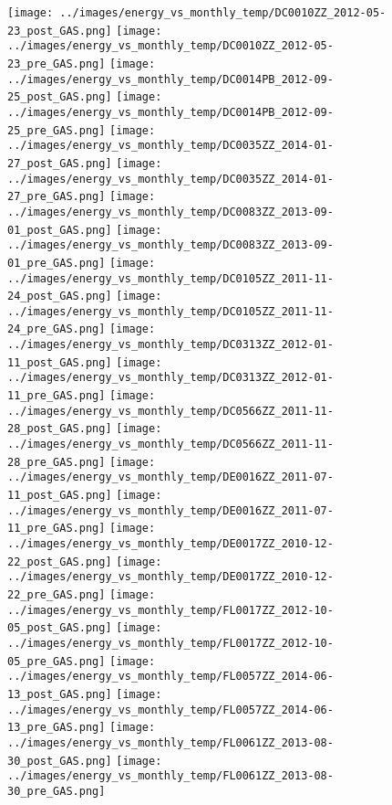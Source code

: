 \clearpage
\begin{figure}
\centering
\texttt{[image: ../images/energy\_vs\_monthly\_temp/DC0010ZZ\_2012-05-23\_post\_GAS.png]}
\texttt{[image: ../images/energy\_vs\_monthly\_temp/DC0010ZZ\_2012-05-23\_pre\_GAS.png]}
\texttt{[image: ../images/energy\_vs\_monthly\_temp/DC0014PB\_2012-09-25\_post\_GAS.png]}
\texttt{[image: ../images/energy\_vs\_monthly\_temp/DC0014PB\_2012-09-25\_pre\_GAS.png]}
\texttt{[image: ../images/energy\_vs\_monthly\_temp/DC0035ZZ\_2014-01-27\_post\_GAS.png]}
\texttt{[image: ../images/energy\_vs\_monthly\_temp/DC0035ZZ\_2014-01-27\_pre\_GAS.png]}
\texttt{[image: ../images/energy\_vs\_monthly\_temp/DC0083ZZ\_2013-09-01\_post\_GAS.png]}
\texttt{[image: ../images/energy\_vs\_monthly\_temp/DC0083ZZ\_2013-09-01\_pre\_GAS.png]}
\texttt{[image: ../images/energy\_vs\_monthly\_temp/DC0105ZZ\_2011-11-24\_post\_GAS.png]}
\texttt{[image: ../images/energy\_vs\_monthly\_temp/DC0105ZZ\_2011-11-24\_pre\_GAS.png]}
\texttt{[image: ../images/energy\_vs\_monthly\_temp/DC0313ZZ\_2012-01-11\_post\_GAS.png]}
\texttt{[image: ../images/energy\_vs\_monthly\_temp/DC0313ZZ\_2012-01-11\_pre\_GAS.png]}
\texttt{[image: ../images/energy\_vs\_monthly\_temp/DC0566ZZ\_2011-11-28\_post\_GAS.png]}
\texttt{[image: ../images/energy\_vs\_monthly\_temp/DC0566ZZ\_2011-11-28\_pre\_GAS.png]}
\texttt{[image: ../images/energy\_vs\_monthly\_temp/DE0016ZZ\_2011-07-11\_post\_GAS.png]}
\texttt{[image: ../images/energy\_vs\_monthly\_temp/DE0016ZZ\_2011-07-11\_pre\_GAS.png]}
\texttt{[image: ../images/energy\_vs\_monthly\_temp/DE0017ZZ\_2010-12-22\_post\_GAS.png]}
\texttt{[image: ../images/energy\_vs\_monthly\_temp/DE0017ZZ\_2010-12-22\_pre\_GAS.png]}
\texttt{[image: ../images/energy\_vs\_monthly\_temp/FL0017ZZ\_2012-10-05\_post\_GAS.png]}
\texttt{[image: ../images/energy\_vs\_monthly\_temp/FL0017ZZ\_2012-10-05\_pre\_GAS.png]}
\texttt{[image: ../images/energy\_vs\_monthly\_temp/FL0057ZZ\_2014-06-13\_post\_GAS.png]}
\texttt{[image: ../images/energy\_vs\_monthly\_temp/FL0057ZZ\_2014-06-13\_pre\_GAS.png]}
\texttt{[image: ../images/energy\_vs\_monthly\_temp/FL0061ZZ\_2013-08-30\_post\_GAS.png]}
\texttt{[image: ../images/energy\_vs\_monthly\_temp/FL0061ZZ\_2013-08-30\_pre\_GAS.png]}
\end{figure}

